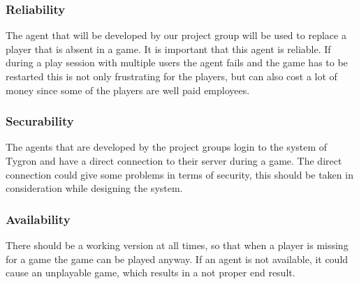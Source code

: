 \subsubsection*{Reliability}
The agent that will be developed by our project group will be used to replace a player that is absent in a game. It is important that this agent is reliable. If during a play session with multiple users the agent fails and the game has to be restarted this is not only frustrating for the players, but can also cost a lot of money since some of the players are well paid employees.

\subsubsection*{Securability}
The agents that are developed by the project groups login to the system of Tygron and have a direct connection to their server during a game. The direct connection could give some problems in terms of security, this should be taken in consideration while designing the system.

\subsubsection*{Availability}
There should be a working version at all times, so that when a player is missing for a game the game can be played anyway. If an agent is not available, it could cause an unplayable game, which results in a not proper end result.
